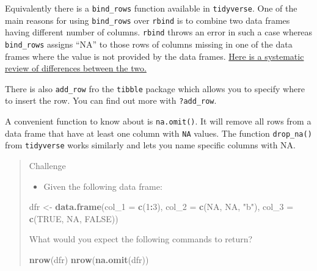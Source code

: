 \documentclass[
]{book}
\newenvironment{Shaded}{\begin{snugshade}}{\end{snugshade}}
\newcommand{\AttributeTok}[1]{\textcolor[rgb]{0.13,0.29,0.53}{#1}}
\newcommand{\ConstantTok}[1]{\textcolor[rgb]{0.56,0.35,0.01}{#1}}
\newcommand{\DecValTok}[1]{\textcolor[rgb]{0.00,0.00,0.81}{#1}}
\newcommand{\FunctionTok}[1]{\textcolor[rgb]{0.13,0.29,0.53}{\textbf{#1}}}
\newcommand{\NormalTok}[1]{#1}
\newcommand{\OtherTok}[1]{\textcolor[rgb]{0.56,0.35,0.01}{#1}}
\newcommand{\SpecialCharTok}[1]{\textcolor[rgb]{0.81,0.36,0.00}{\textbf{#1}}}
\newcommand{\StringTok}[1]{\textcolor[rgb]{0.31,0.60,0.02}{#1}}
\providecommand{\tightlist}{%
  \setlength{\itemsep}{0pt}\setlength{\parskip}{0pt}}
\begin{document}
Equivalently there is a \texttt{bind\_rows} function available in \texttt{tidyverse}. One of the main reasons for using \texttt{bind\_rows} over \texttt{rbind} is to combine two data frames having different number of columns. \texttt{rbind} throws an error in such a case whereas \texttt{bind\_rows} assigns ``NA'' to those rows of columns missing in one of the data frames where the value is not provided by the data frames. \href{https://stackoverflow.com/a/59482527}{Here is a systematic review of differences between the two.}

There is also \texttt{add\_row} fro the \texttt{tibble} package which allows you to specify where to insert the row. You can find out more with \texttt{?add\_row}.

A convenient function to know about is \texttt{na.omit()}. It will remove all rows from a data frame that have at least one column with \texttt{NA} values. The function \texttt{drop\_na()} from \texttt{tidyverse} works similarly and lets you name specific columns with NA.

\begin{quote}
Challenge

\begin{itemize}
\tightlist
\item
  Given the following data frame:
\end{itemize}

\begin{Shaded}
\begin{Highlighting}[]
\NormalTok{dfr }\OtherTok{\textless{}{-}} \FunctionTok{data.frame}\NormalTok{(}\AttributeTok{col\_1 =} \FunctionTok{c}\NormalTok{(}\DecValTok{1}\SpecialCharTok{:}\DecValTok{3}\NormalTok{), }
                  \AttributeTok{col\_2 =} \FunctionTok{c}\NormalTok{(}\ConstantTok{NA}\NormalTok{, }\ConstantTok{NA}\NormalTok{, }\StringTok{"b"}\NormalTok{), }
                  \AttributeTok{col\_3 =} \FunctionTok{c}\NormalTok{(}\ConstantTok{TRUE}\NormalTok{, }\ConstantTok{NA}\NormalTok{, }\ConstantTok{FALSE}\NormalTok{))}
\end{Highlighting}
\end{Shaded}

What would you expect the following commands to return?

\begin{Shaded}
\begin{Highlighting}[]
\FunctionTok{nrow}\NormalTok{(dfr)}
\FunctionTok{nrow}\NormalTok{(}\FunctionTok{na.omit}\NormalTok{(dfr))}
\end{Highlighting}
\end{Shaded}
\end{quote}


\end{document}
